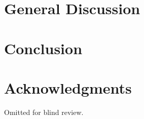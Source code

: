 \documentclass{sigchi}\usepackage[]{graphicx}\usepackage[]{color}
\begin{document}
\section{General Discussion}


\section{Conclusion}


\section{Acknowledgments}
Omitted for blind review.

%
%
%
%
%
\balance



\end{document}
